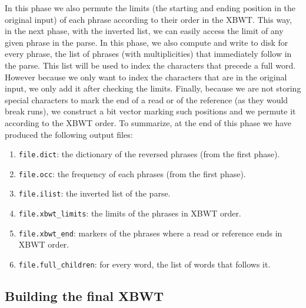 In this phase we also permute the limits (the starting and ending position in the original input) of each phrase according to their order in the XBWT. This way, in the next phase, with the inverted list, we can easily access the limit of any given phrase in the parse. In this phase, we also compute and write to disk for every phrase, the list of phrases (with multiplicities) that immediately follow in the parse. This list will be used to index the characters that precede a full word. However because we only want to index the characters that are in the original input, we only add it after checking the limits. Finally, because we are not storing special characters to mark the end of a read or of the reference (as they would break runs), we construct a bit vector marking such positions and we permute it according to the XBWT order. To summarize, at the end of this phase we have produced the following output files:
\begin{enumerate}
    \item \texttt{file.dict}: the dictionary of the reversed phrases (from the first phase).
    \item \texttt{file.occ}: the frequency of each phrases (from the first phase).
    \item \texttt{file.ilist}: the inverted list of the parse.
    \item \texttt{file.xbwt\_limits}: the limits of the phrases in XBWT order.
    \item \texttt{file.xbwt\_end}: markers of the phrases where a read or reference ends in XBWT order.
    \item \texttt{file.full\_children}: for every word, the list of words that follows it.
\end{enumerate}


\subsection{Building the final XBWT}

